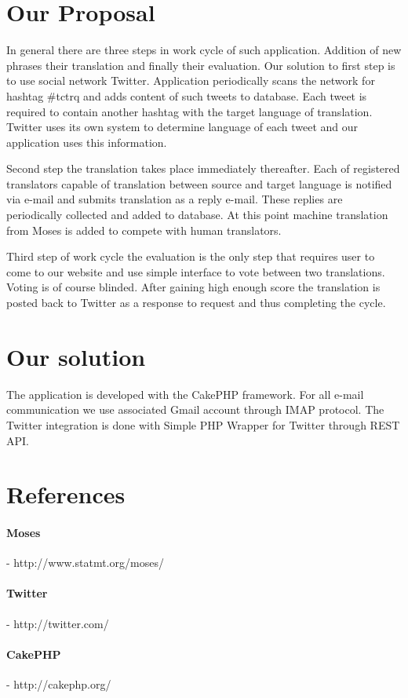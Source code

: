 \section{Our Proposal}
In general there are three steps in work cycle of such application. Addition of new phrases their translation and finally their evaluation. Our solution to first step is to use social network Twitter. Application periodically scans the network for hashtag \#tctrq and adds content of such tweets to database. Each tweet is required to contain another hashtag with the target language of translation. Twitter uses its own system to determine language of each tweet and our application uses this information. 

Second step the translation takes place immediately thereafter. Each of registered translators capable of translation between source and target language is notified via e-mail and submits translation as a reply e-mail. These replies are periodically collected and added to database. At this point machine translation from Moses is added to compete with human translators. 

Third step of work cycle the evaluation is the only step that requires user to come to our website and use simple interface to vote between two translations. Voting is of course blinded. After gaining high enough score the translation is posted back to Twitter as a response to request and thus completing the cycle. 
%
\section{Our solution}
The application is developed with the CakePHP framework. For all e-mail communication we use associated Gmail account through IMAP protocol. The Twitter integration is done with Simple PHP Wrapper for Twitter through REST API.
%

\section*{References}


 

\paragraph{Moses} - http://www.statmt.org/moses/
\paragraph{Twitter} - http://twitter.com/
\paragraph{CakePHP} - http://cakephp.org/

 
